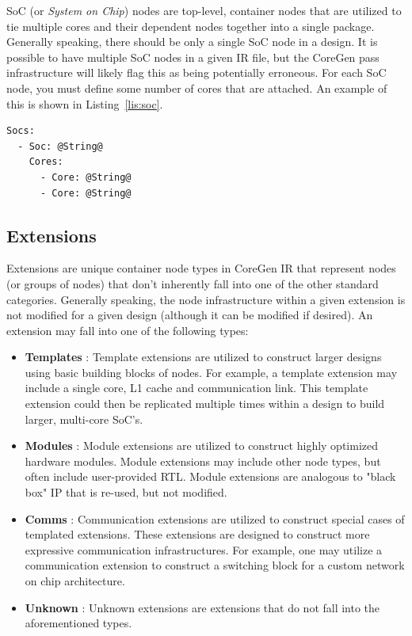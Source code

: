 \documentclass{article}
\begin{document}
SoC (or \textit{System on Chip}) nodes are top-level, container nodes that are utilized to tie multiple cores and their dependent 
nodes together into a single package.  Generally speaking, there should be only a single SoC node in a design.  It is possible to 
have multiple SoC nodes in a given IR file, but the CoreGen pass infrastructure will likely flag this as being potentially erroneous.  
For each SoC node, you must define some number of cores that are attached.  An example of this is shown in Listing~\ref{lis:soc}.  

\vspace{0.125in}
\begin{lstlisting}[frame=single,style=base,caption={SoC Node Definition},captionpos=b,label={lis:soc}]
Socs:
  - Soc: @String@
    Cores:
      - Core: @String@
      - Core: @String@
\end{lstlisting}


\clearpage
\subsection{Extensions}
\label{sec:ExtensionNodes}

Extensions are unique container node types in CoreGen IR that represent nodes (or groups of nodes) that don't inherently 
fall into one of the other standard categories.  Generally speaking, the node infrastructure within a given extension 
is not modified for a given design (although it can be modified if desired).  An extension may fall into one of the following types: 

\begin{itemize}
\item \textbf{Templates} : Template extensions are utilized to construct larger designs using basic building blocks of 
nodes.  For example, a template extension may include a single core, L1 cache and communication link.  This template 
extension could then be replicated multiple times within a design to build larger, multi-core SoC's.
 
\item \textbf{Modules} : Module extensions are utilized to construct highly optimized hardware modules.  Module extensions 
may include other node types, but often include user-provided RTL.  Module extensions are analogous to "black box" IP 
that is re-used, but not modified.    

\item \textbf{Comms} : Communication extensions are utilized to construct special cases of templated extensions.  These 
extensions are designed to construct more expressive communication infrastructures.  For example, one may utilize a 
communication extension to construct a switching block for a custom network on chip architecture.  

\item \textbf{Unknown} : Unknown extensions are extensions that do not fall into the aforementioned types.  
\end{itemize}
\end{document}
